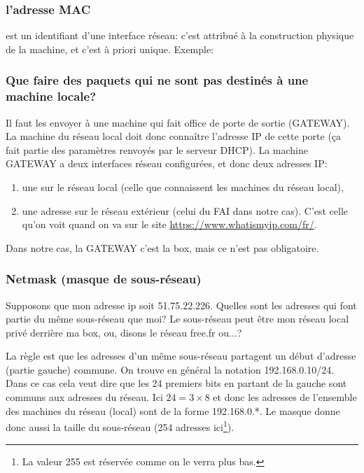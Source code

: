 \subsubsection{l'adresse MAC} est un identifiant d'une
interface réseau: c'est attribué à la construction physique de la
machine, et c'est à priori 
unique. Exemple:

\begin{center}
\end{center}

\subsubsection{Que faire des paquets qui ne sont pas destinés à une
  machine locale?} Il faut les envoyer à une machine qui fait office
de porte de sortie (GATEWAY). La machine du réseau local doit donc
connaître l'adresse IP de cette porte (ça fait partie des paramètres
renvoyés par le serveur DHCP). La machine GATEWAY a deux interfaces
réseau configurées, et donc deux adresses IP:
\begin{enumerate}
  \item une sur le réseau local (celle que connaissent les machines du
    réseau local),
  \item une adresse sur le réseau extérieur (celui du FAI dans notre
    cas). C'est celle qu'on voit quand on va sur le site
    \url{https://www.whatismyip.com/fr/}.
\end{enumerate}
Dans notre cas, la GATEWAY  c'est la box, mais ce n'est
pas obligatoire.
\subsubsection{Netmask (masque de sous-réseau)}
Supposons que mon adresse ip soit 51.75.22.226. Quelles sont les
adresses qui font partie du même sous-réseau que moi? Le sous-réseau
peut être mon réseau local privé derrière ma box, ou, disons le réseau
free.fr ou...?

La règle est que les  adresses d'un même sous-réseau partagent un
début d'adresse (partie 
gauche) commune. On trouve en général la notation
192.168.0.10/24. Dans ce cas cela veut dire que les 24 premiers bits
en partant de la gauche sont communs aux adresses du réseau. Ici $24 =
3 \times 8$ et donc les adresses de l'ensemble des machines  du
réseau (local) sont de la
forme 192.168.0.*. Le masque donne donc aussi la taille du
sous-réseau (254 adresses ici\footnote{La valeur 255 est réservée
  comme on le verra plus bas.}).

